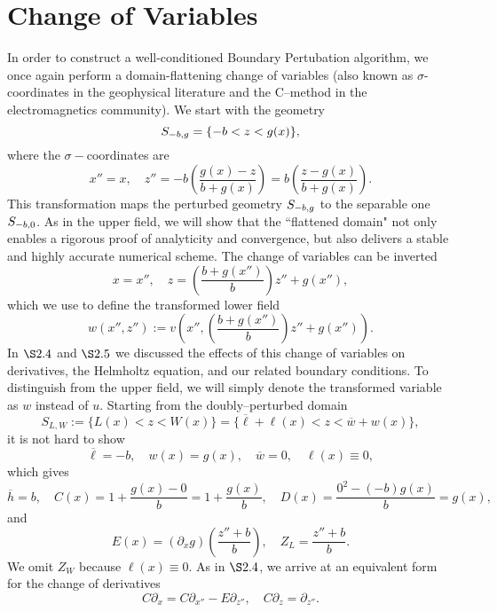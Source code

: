 
\section{Change of Variables}
\label{intro:change_of_variables in lower field}
In order to construct a well-conditioned Boundary Pertubation algorithm,
we once again perform a domain-flattening change of variables (also known as $\sigma$-coordinates \cite{Phillips57} in the geophysical
literature and the C--method \cite{CDCM82,CMR80} in the electromagnetics community). We start with the geometry
$$S_{\tiny{-} b,g}=\{-b<z<g(x)\},$$
where the $\sigma-$coordinates are
\begin{equation}x''=x,\quad z''=-b\left(\frac{g(x)-z}{b+g(x)}\right)=b\left(\frac{z-g(x)}{b+g(x)}\right).\end{equation}
This transformation maps the perturbed geometry $S_{\tiny{-} b,g}$ to the separable one $S_{\tiny{-} b,0}$. As in the upper field, we will show that the ``flattened domain" not only  enables a rigorous proof of analyticity and convergence, but also delivers a stable and highly accurate numerical scheme.
\newline
\newline
The change of variables can be inverted
$$x=x'',\quad z=\left(\frac{b+g(x'')}{b}\right)z''+g(x''),$$
which we use to define the transformed lower field
$$w(x'',z''):=v\left(x'',\left(\frac{b+g(x'')}{b}\right)z''+g(x'')\right).$$
In $\S 2.4$ and $\S 2.5$ we discussed the effects of this change of variables on derivatives, the Helmholtz equation, and our related boundary conditions. To distinguish from the upper field, we will simply denote the transformed variable as $w$ instead of $u$. Starting from the doubly--perturbed domain
\begin{equation}
S_{L,W}:=\{L(x)<z<W(x)\}=\{\overline{\ell}+\ell(x)<z<\overline{w}+w(x)\},    
\end{equation}
it is not hard to show
$$\overline{{\ell}}=-b,\quad w(x)=g(x),\quad\overline{w}=0,\quad {\ell}(x)\equiv 0,$$
which gives
$$\overline{h}=b,\quad C(x)=1+\frac{g(x)-0}{b}=1+\frac{g(x)}{b},\quad D(x)=\frac{0^2-(-b)g(x)}{b}=g(x),$$
and
$$E(x)=\left(\partial_x g\right)\left(\frac{z''+b}{b}\right), \quad Z_L=\frac{z''+b}{b}.$$
We omit $Z_W$ because ${\ell}(x)\equiv 0$. As in $\S2.4$, we arrive at an equivalent form for the change of derivatives
\begin{equation}
C\partial_x = C\partial_{x''} - E\partial_{z''}, \quad C\partial_z = \partial_{z''}.  
\end{equation}